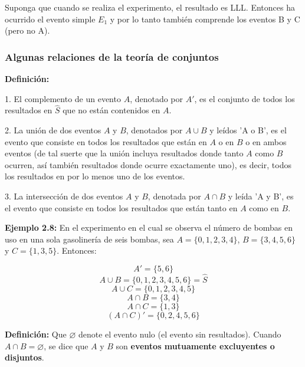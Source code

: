 \documentclass[a4paper]{article}
\begin{document}
Suponga que cuando se realiza el experimento, el resultado es LLL. Entonces ha ocurrido el evento simple $E_1$ y por lo tanto también comprende los eventos B y C (pero no A).

\subsubsection{Algunas relaciones de la teoría de conjuntos}

\textbf{Definición:}

1. El complemento de un evento $A$, denotado por $A'$, es el conjunto de todos los resultados en $\hat{S}$ que no están contenidos en $A$.

2. La unión de dos eventos $A$ y $B$, denotados por $A \cup B$ y leídos 'A o B', es el evento que consiste en todos los resultados que están en $A$ o en $B$ o en ambos eventos (de tal suerte que la unión incluya resultados donde tanto $A$ como $B$ ocurren, así también resultados donde ocurre exactamente uno), es decir, todos los resultados en por lo menos uno de los eventos.

3. La intersección de dos eventos $A$ y $B$, denotada por $A \cap B$ y leída 'A y B', es el evento que consiste en todos los resultados que están tanto en $A$ como en $B$.


\textbf{Ejemplo 2.8:}
En el experimento en el cual se observa el número de bombas en uso en una sola gasolinería de seis bombas, sea $A = \{0, 1, 2, 3, 4\}$, $B = \{3, 4, 5, 6\}$ y $C = \{1, 3, 5\}$. Entonces:

$$ A' = \{5, 6\} $$
$$ A \cup B = \{0, 1, 2, 3, 4, 5, 6\} = \hat{S} $$
$$ A \cup C = \{0, 1, 2, 3, 4, 5\} $$
$$ A \cap B = \{3, 4\} $$
$$ A \cap C = \{1, 3\} $$
$$ (A \cap C)' = \{0, 2, 4, 5, 6\} $$

\textbf{Definición:}
Que $\varnothing$ denote el evento nulo (el evento sin resultados). Cuando $A \cap B = \varnothing$, se dice que $A$ y $B$ son \textbf{eventos mutuamente excluyentes o disjuntos}. 
\end{document}
